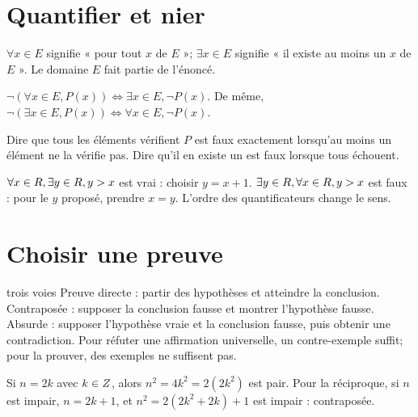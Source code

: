 \section{Quantifier et nier}
\begin{definition}$\forall x\in E$ signifie « pour tout $x$ de $E$ »; $\exists x\in E$ signifie « il existe au moins un $x$ de $E$ ». Le domaine $E$ fait partie de l’énoncé.\end{definition}
\begin{propriete}
$\neg(\forall x\in E, P(x))\Leftrightarrow\exists x\in E,\neg P(x)$.
De même, $\neg(\exists x\in E,P(x))\Leftrightarrow\forall x\in E,\neg P(x)$.
\end{propriete}
\begin{demonstration}Dire que tous les éléments vérifient $P$ est faux exactement lorsqu’au moins un élément ne la vérifie pas. Dire qu’il en existe un est faux lorsque tous échouent.\end{demonstration}
\begin{exemple}$\forall x\in R,\exists y\in R,y>x$ est vrai : choisir $y=x+1$. $\exists y\in R,\forall x\in R,y>x$ est faux : pour le $y$ proposé, prendre $x=y$. L’ordre des quantificateurs change le sens.\end{exemple}
\section{Choisir une preuve}
\begin{methode}{trois voies}
Preuve directe : partir des hypothèses et atteindre la conclusion. Contraposée : supposer la conclusion fausse et montrer l’hypothèse fausse. Absurde : supposer l’hypothèse vraie et la conclusion fausse, puis obtenir une contradiction. Pour réfuter une affirmation universelle, un contre-exemple suffit; pour la prouver, des exemples ne suffisent pas.
\end{methode}
\begin{exemple}Si $n=2k$ avec $k\in Z$, alors $n^2=4k^2=2(2k^2)$ est pair. Pour la réciproque, si $n$ est impair, $n=2k+1$, et $n^2=2(2k^2+2k)+1$ est impair : contraposée.\end{exemple}


